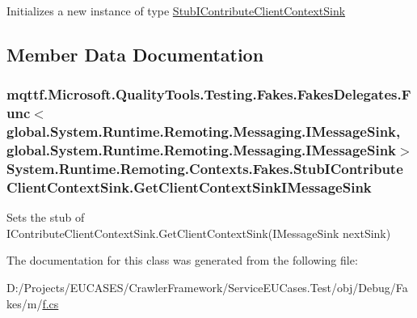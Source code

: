 Initializes a new instance of type \hyperlink{class_system_1_1_runtime_1_1_remoting_1_1_contexts_1_1_fakes_1_1_stub_i_contribute_client_context_sink}{Stub\-I\-Contribute\-Client\-Context\-Sink}



\subsection{Member Data Documentation}
\hypertarget{class_system_1_1_runtime_1_1_remoting_1_1_contexts_1_1_fakes_1_1_stub_i_contribute_client_context_sink_a6098bae0d2bdfe548a5dd37a59fd4430}{
\subsubsection[{Get\-Client\-Context\-Sink\-I\-Message\-Sink}]{\setlength{\rightskip}{0pt plus 5cm}mqttf.\-Microsoft.\-Quality\-Tools.\-Testing.\-Fakes.\-Fakes\-Delegates.\-Func$<$global.\-System.\-Runtime.\-Remoting.\-Messaging.\-I\-Message\-Sink, global.\-System.\-Runtime.\-Remoting.\-Messaging.\-I\-Message\-Sink$>$ System.\-Runtime.\-Remoting.\-Contexts.\-Fakes.\-Stub\-I\-Contribute\-Client\-Context\-Sink.\-Get\-Client\-Context\-Sink\-I\-Message\-Sink}}\label{class_system_1_1_runtime_1_1_remoting_1_1_contexts_1_1_fakes_1_1_stub_i_contribute_client_context_sink_a6098bae0d2bdfe548a5dd37a59fd4430}


Sets the stub of I\-Contribute\-Client\-Context\-Sink.\-Get\-Client\-Context\-Sink(\-I\-Message\-Sink next\-Sink)



The documentation for this class was generated from the following file\-:\begin{DoxyCompactItemize}
\item 
D\-:/\-Projects/\-E\-U\-C\-A\-S\-E\-S/\-Crawler\-Framework/\-Service\-E\-U\-Cases.\-Test/obj/\-Debug/\-Fakes/m/\hyperlink{m_2f_8cs}{f.\-cs}\end{DoxyCompactItemize}
